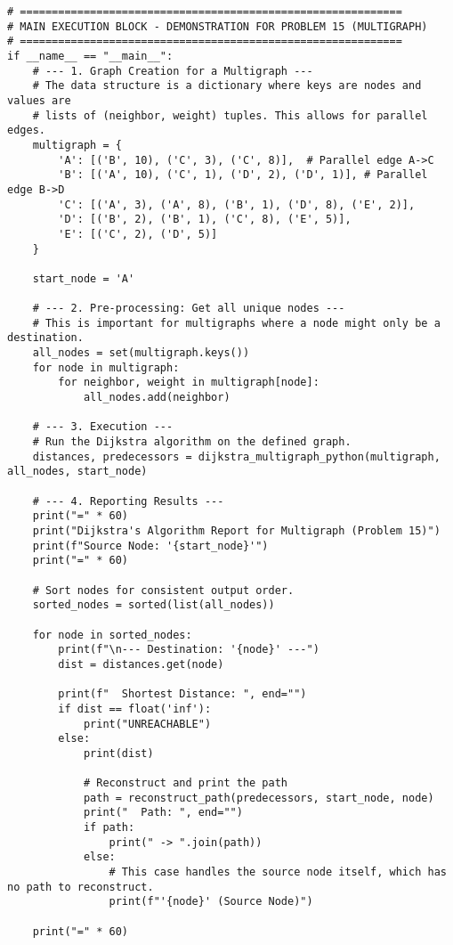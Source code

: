 \documentclass[a4paper,12pt]{article}
\begin{document}
\begin{lstlisting}[style=pythonstyle, caption={Cài đặt Dijkstra cho đa đồ thị trong Python.}, label={lst:python_multi_full}]
# ============================================================
# MAIN EXECUTION BLOCK - DEMONSTRATION FOR PROBLEM 15 (MULTIGRAPH)
# ============================================================
if __name__ == "__main__":
    # --- 1. Graph Creation for a Multigraph ---
    # The data structure is a dictionary where keys are nodes and values are
    # lists of (neighbor, weight) tuples. This allows for parallel edges.
    multigraph = {
        'A': [('B', 10), ('C', 3), ('C', 8)],  # Parallel edge A->C
        'B': [('A', 10), ('C', 1), ('D', 2), ('D', 1)], # Parallel edge B->D
        'C': [('A', 3), ('A', 8), ('B', 1), ('D', 8), ('E', 2)],
        'D': [('B', 2), ('B', 1), ('C', 8), ('E', 5)],
        'E': [('C', 2), ('D', 5)]
    }

    start_node = 'A'

    # --- 2. Pre-processing: Get all unique nodes ---
    # This is important for multigraphs where a node might only be a destination.
    all_nodes = set(multigraph.keys())
    for node in multigraph:
        for neighbor, weight in multigraph[node]:
            all_nodes.add(neighbor)

    # --- 3. Execution ---
    # Run the Dijkstra algorithm on the defined graph.
    distances, predecessors = dijkstra_multigraph_python(multigraph, all_nodes, start_node)

    # --- 4. Reporting Results ---
    print("=" * 60)
    print("Dijkstra's Algorithm Report for Multigraph (Problem 15)")
    print(f"Source Node: '{start_node}'")
    print("=" * 60)

    # Sort nodes for consistent output order.
    sorted_nodes = sorted(list(all_nodes))

    for node in sorted_nodes:
        print(f"\n--- Destination: '{node}' ---")
        dist = distances.get(node)
        
        print(f"  Shortest Distance: ", end="")
        if dist == float('inf'):
            print("UNREACHABLE")
        else:
            print(dist)
            
            # Reconstruct and print the path
            path = reconstruct_path(predecessors, start_node, node)
            print("  Path: ", end="")
            if path:
                print(" -> ".join(path))
            else:
                # This case handles the source node itself, which has no path to reconstruct.
                print(f"'{node}' (Source Node)")

    print("=" * 60)

\end{lstlisting}
\end{document}
